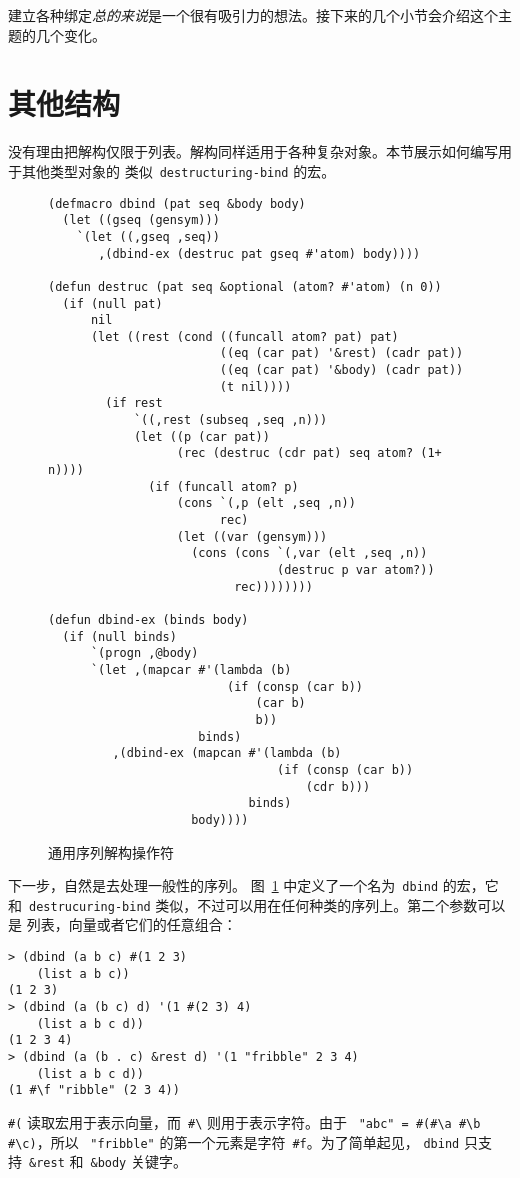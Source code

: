 建立各种绑定\emph{总的来说}是一个很有吸引力的想法。接下来的几个小节会介绍这个主题的几个变化。

\section{其他结构}
\label{sec:other_structures}

没有理由把解构仅限于列表。解构同样适用于各种复杂对象。本节展示如何编写用于其他类型对象的
类似~\texttt{destructuring-bind} 的宏。

\begin{figure}
\begin{lstlisting}
(defmacro dbind (pat seq &body body)
  (let ((gseq (gensym)))
    `(let ((,gseq ,seq))
       ,(dbind-ex (destruc pat gseq #'atom) body))))

(defun destruc (pat seq &optional (atom? #'atom) (n 0))
  (if (null pat)
      nil
      (let ((rest (cond ((funcall atom? pat) pat)
                        ((eq (car pat) '&rest) (cadr pat))
                        ((eq (car pat) '&body) (cadr pat))
                        (t nil))))
        (if rest
            `((,rest (subseq ,seq ,n)))
            (let ((p (car pat))
                  (rec (destruc (cdr pat) seq atom? (1+ n))))
              (if (funcall atom? p)
                  (cons `(,p (elt ,seq ,n))
                        rec)
                  (let ((var (gensym)))
                    (cons (cons `(,var (elt ,seq ,n))
                                (destruc p var atom?))
                          rec))))))))

(defun dbind-ex (binds body)
  (if (null binds)
      `(progn ,@body)
      `(let ,(mapcar #'(lambda (b)
                         (if (consp (car b))
                             (car b)
                             b))
                     binds)
         ,(dbind-ex (mapcan #'(lambda (b)
                                (if (consp (car b))
                                    (cdr b)))
                            binds)
                    body))))
\end{lstlisting}
  \caption{通用序列解构操作符}
  \label{fig:general_sequence_destructuring_operator}
\end{figure}

下一步，自然是去处理一般性的序列。
图~\ref{fig:general_sequence_destructuring_operator} 中定义了一个名为~\texttt{dbind}
的宏，它和~\texttt{destrucuring-bind} 类似，不过可以用在任何种类的序列上。第二个参数可以是
列表，向量或者它们的任意组合：
\begin{lstlisting}
> (dbind (a b c) #(1 2 3)
    (list a b c))
(1 2 3)
> (dbind (a (b c) d) '(1 #(2 3) 4)
    (list a b c d))
(1 2 3 4)
> (dbind (a (b . c) &rest d) '(1 "fribble" 2 3 4)
    (list a b c d))
(1 #\f "ribble" (2 3 4))
\end{lstlisting}
\verb|#(| 读取宏用于表示向量，而~\verb|#\|\index{\#\textbacksplash\@\texttt{\#\textbackslash}} 则用于表示字符。由于
~\verb|"abc" = #(#\a #\b #\c)|，所以
~\texttt{"fribble"} 的第一个元素是字符~\verb|#f|。为了简单起见，
\texttt{dbind} 只支持~\verb|&rest| 和~\verb|&body| 关键字。

